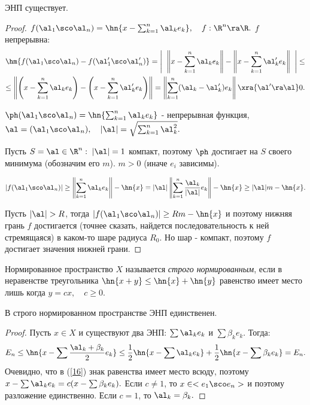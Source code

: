 \documentclass[a4paper]{article}
\begin{document}
\begin{theorem}
ЭНП существует.
\end{theorem}
\begin{proof}

  $f(\al_1\sco \al_n)=\hn{x-\sum_{k=1}^n \al_k e_k},\quad
  f:\R ^n\ra \R .$ $f$ непрерывна:
  \begin{multline*}
    \hm{f(\al_1\sco \al_n)-f(\al_1'\sco \al_n')}=\left|\;\;\left\|x-\sum_{k=1}^n
    \al_k e_k\right\|-\left\|x-\sum_{k=1}^n \al_k'
    e_k\right\|\;\;\right|\le\\
    \le\left\|\left(x-\sum_{k=1}^n \al_k
    e_k\right)-\left(x-\sum_{k=1}^n \al_k'
    e_k\right)\right\|=\left\|\sum_{k=1}^n (\al_k-\al_k')
    e_k\right\|\xra{\al'\ra\al}0.
  \end{multline*}

  $\ph(\al_1\sco \al_n)=\hn{\sum_{k=1}^n \al_k e_k}$
  - непрерывная функция, $\al=(\al_1\sco \al_n),\quad|\al|=\sqrt{\sum_{k=1}^n\al_k^2}.$

  Пусть $S={\al\in\R ^n:\;|\al|=1}$ компакт, поэтому
  $\ph$ достигает на $S$ своего минимума (обозначим его $m$). $m>0$
  (иначе $e_i$ зависимы).

  $$|f(\al_1\sco \al_n)|\ge\left\|\sum_{k=1}^n \al_k
  e_k\right\|-\hn{x}=|\al|\left\|\sum_{k=1}^n
  \frac{\al_k}{|\al|} e_k\right\|-\hn{x}\ge|\al| m-\hn{x}.$$

  Пусть $|\al|>R$, тогда $|f(\al_1\sco \al_n)|\ge
  Rm-\hn{x}$ и поэтому нижняя грань $f$ достигается (точнее сказать,
  найдется последовательность к ней стремящаяся) в каком-то шаре
  радиуса $R_0$. Но шар - компакт, поэтому $f$ достигает значения
  нижней грани.
\end{proof}

\begin{df}
  Нормированное пространство $X$ называется \emph{строго нормированным}, если в
  неравенстве треугольника $\hn{x+y}\le\hn{x}+\hn{y}$ равенство имеет место лишь когда $y=cx, \quad c\ge0$.
\end{df}

\begin{theorem} В строго нормированном пространстве ЭНП
единственен.
\end{theorem}
\begin{proof}
  Пусть $x\in X$ и существуют два ЭНП:
  $\sum\al_k e_k$ и $\sum\beta_k e_k.$ Тогда:
  \begin{equation}\label{16}
    E_n\le\hn{x-\sum\frac{\al_k+\beta_k}2e_k}\le\frac12\hn{x-\sum\al_k e_k}+\frac12\hn{x-\sum\beta_k e_k}=E_n.
  \end{equation}
  Очевидно, что в (\ref{16}) знак равенства имеет место всюду,
  поэтому $x-\sum\al_k e_k=c(x-\sum\beta_k e_k).$ Если $c\neq1$,
  то $x\in<e_1\sco e_n>$ и поэтому разложение единственно. Если
  $c=1$, то $\al_k=\beta_k.$
\end{proof}
\end{document}
